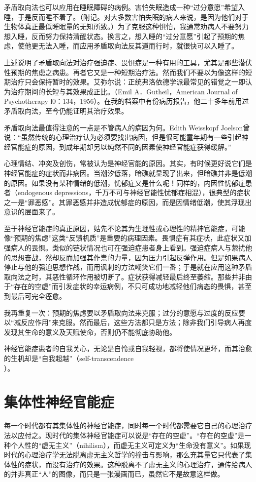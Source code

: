\documentclass[11pt,oneside]{book}
\begin{document}
\begin{common-format}
矛盾取向法也可以应用在睡眠障碍的病例。害怕失眠造成一种“过分意愿”希望入睡，于是反而睡不着了。（附记。对大多数害怕失眠的病人来说，是因为他们对于生物体真正最低睡眠量的无知所致。）为了克服这种惧怕，我通常劝病人不要努力想入睡，反而努力保持清醒状态。换言之，想入睡的“过分意愿”引起了预期的焦虑，使他更无法入睡，而应用矛盾取向法反其道而行时，就很快可以入睡了。

上述说明了矛盾取向法对治疗强迫症、畏惧症是一种有用的工具，尤其是那些潜伏性预期的焦虑之病患。再者它又是一种短期治疗法。然而我们不要以为像这样的短期治疗只会保持暂时的效果。艾弥尔说：正统弗洛依德学派最常见的错觉之一即认为治疗期间的长短与其效果成正比。（Emil A．Gutheil，American Journal of Psychotherapy l0：134，1956）。在我的档案中有份病历报告，他二十多年前用过矛盾取向法，至今仍能证明其治疗效果。

矛盾取向法最值得注意的一点是不管病人的病因为何。Edith Weisskopf Joelson曾说：“虽然传统的心理治疗认为必须要找出病因，但是很可能童年期有一些引起神经官能症的原因，到成年期却另以纯然不同的因素使神经官能症获得缓解。”

心理情结、冲突及创伤，常被认为是神经官能的原因。其实，有时候更好说它们是神经官能症的症状而非病因。当潮汐低落，暗礁就显现了出来，但暗礁并非是低潮的原因。如果没有某种情绪的低潮，忧郁症又是什么呢！同样的，内因性忧郁症患者（endogenous depressions，千万不可与神经官能性忧郁症相混），很典型的症状之一是“罪恶感”。其罪恶感并非造成忧郁症的原因，而是因情绪低潮，使其浮现出意识的层面来了。

至于神经官能症的真正原因，姑先不论其为生理性或心理性的精抻官能症，可能像“预期的焦虑”这类“反馈机质”是重要的病理因素。畏惧症有其症状，此症状又加强病人的畏惧。类似的链状情况也可在强迫症患者身上看到。强迫症病人与萦扰他的思想奋战，然却反而加强其作祟的力量，因为压力引起反弹作用。但是如果病人停止与他的强迫思想作战，而用讽刺的方法嘲笑它们一番；于是就在应用这种矛盾取向法之时，其恶性循环作用被切断了。症状获得减轻最后终至萎缩。那些并非由于“存在的空虚”而引发症状的幸运病例，不只可成功地减轻他们病态的畏惧，甚至到最后可完全痊愈。

我再重复一次：预期的焦虑要以矛盾取向法来克服；过分的意愿与过度的反应要以“减反应作用”来克服。然而最后，这些方法都只是方法；除非我们引导病人再度发现其生命的意义及天赋使命，否则仍不能彻底协助他。

神经官能症患者的自我关心，无论是自怜或自我轻视，都将使情况更坏，而其治愈的生机却是“自我超越”（self-transcendence\\）。


\section{集体性神经官能症}
每一个时代都有其集体性的神经官能症，同时每一个时代都需要它自己的心理治疗法以应付之。现时代的集体神经官能症可以说是“存在的空虚”。“存在的空虚”是一种个人性的“虚无主义”（nihilism），而虚无主义可定义为“生命没有意义”。如果现时代的心理治疗学无法脱离虚无主义哲学的撞击与影响，那么充其量它只代表了集体性的症状，而没有治疗的效果。这种脱离不了虚无主义的心理治疗，通传给病人的并非真正“人”的图像，而只是一张漫画而已，虽然它不是故意这样做。


\end{common-format}
\end{document}
